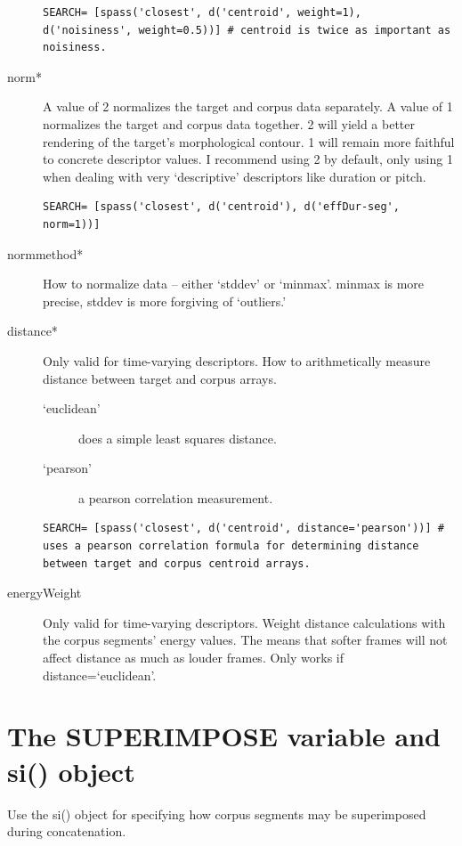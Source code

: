 \documentclass{article}
\begin{document}
\begin{spacing}{1.2}
\begin{description}
\begin{lstlisting}
SEARCH= [spass('closest', d('centroid', weight=1), d('noisiness', weight=0.5))] # centroid is twice as important as noisiness.
\end{lstlisting}

\item[norm*] A value of 2 normalizes the target and corpus data separately.  A value of 1 normalizes the target and corpus data together.  2 will yield a better rendering of the target's morphological contour.  1 will remain more faithful to concrete descriptor values.  I recommend using 2 by default, only using 1 when dealing with very `descriptive' descriptors like duration or pitch.

\begin{lstlisting}
SEARCH= [spass('closest', d('centroid'), d('effDur-seg', norm=1))]
\end{lstlisting}

\item[normmethod*] How to normalize data -- either `stddev' or `minmax'.  minmax is more precise, stddev is more forgiving of `outliers.'

\item[distance*] Only valid for time-varying descriptors.  How to arithmetically measure distance between target and corpus arrays.  
\begin{description}
\item[`euclidean'] does a simple least squares distance.
\item[`pearson'] a pearson correlation measurement.
\end{description}

\begin{lstlisting}
SEARCH= [spass('closest', d('centroid', distance='pearson'))] # uses a pearson correlation formula for determining distance between target and corpus centroid arrays.
\end{lstlisting}

\item[energyWeight] Only valid for time-varying descriptors.  Weight distance calculations with the corpus segments' energy values.  The means that softer frames will not affect distance as much as louder frames.  Only works if distance=`euclidean'.
\end{description}


\section{The SUPERIMPOSE variable and si() object}
Use the si() object for specifying how corpus segments may be superimposed during concatenation.


\end{spacing}
\end{document}
